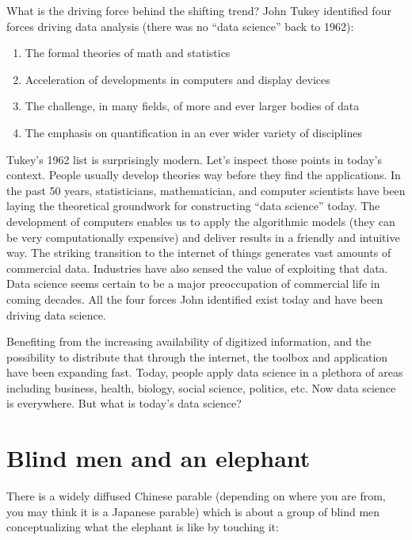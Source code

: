 \documentclass[12pt,]{krantz}
\providecommand{\tightlist}{%
  \setlength{\itemsep}{0pt}\setlength{\parskip}{0pt}}
\theoremstyle{definition}
\theoremstyle{definition}
\theoremstyle{definition}
\theoremstyle{remark}
\begin{document}
What is the driving force behind the shifting trend? John Tukey
identified four forces driving data analysis (there was no ``data
science'' back to 1962):

\begin{enumerate}
\def\labelenumi{\arabic{enumi}.}
\tightlist
\item
  The formal theories of math and statistics
\item
  Acceleration of developments in computers and display devices
\item
  The challenge, in many fields, of more and ever larger bodies of data
\item
  The emphasis on quantification in an ever wider variety of disciplines
\end{enumerate}

Tukey's 1962 list is surprisingly modern. Let's inspect those points in
today's context. People usually develop theories way before they find
the applications. In the past 50 years, statisticians, mathematician,
and computer scientists have been laying the theoretical groundwork for
constructing ``data science'' today. The development of computers
enables us to apply the algorithmic models (they can be very
computationally expensive) and deliver results in a friendly and
intuitive way. The striking transition to the internet of things
generates vast amounts of commercial data. Industries have also sensed
the value of exploiting that data. Data science seems certain to be a
major preoccupation of commercial life in coming decades. All the four
forces John identified exist today and have been driving data science.

Benefiting from the increasing availability of digitized information,
and the possibility to distribute that through the internet, the toolbox
and application have been expanding fast. Today, people apply data
science in a plethora of areas including business, health, biology,
social science, politics, etc. Now data science is everywhere. But what
is today's data science?

\section{Blind men and an elephant}\label{blind-men-and-an-elephant}

There is a widely diffused Chinese parable (depending on where you are
from, you may think it is a Japanese parable) which is about a group of
blind men conceptualizing what the elephant is like by touching it:
\end{document}
